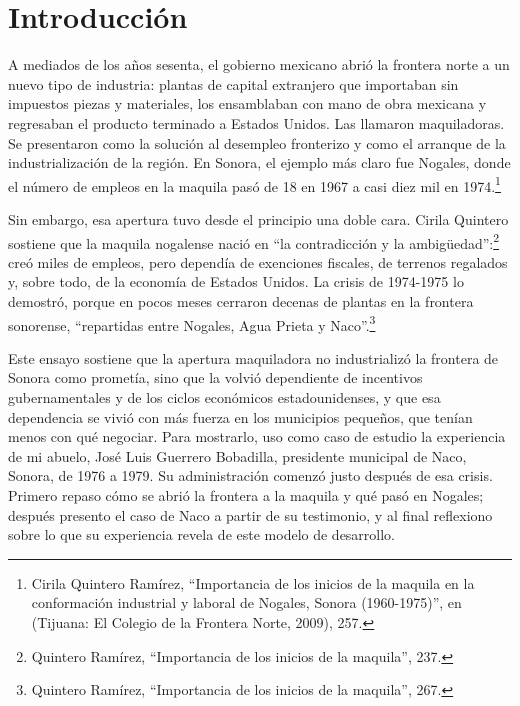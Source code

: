 \documentclass[12pt]{article}
\newcommand{\quinterolargo}{Cirila Quintero Ramírez, \enquote{Importancia de los inicios de la maquila en la conformación industrial y laboral de Nogales, Sonora (1960-1975)}, en \pendiente{\emph{Título del libro}, coord. Nombre} (Tijuana: El Colegio de la Frontera Norte, 2009)}
\newcommand{\quintero}{Quintero Ramírez, \enquote{Importancia de los inicios de la maquila}}
\begin{document}
\unisonportada
\thispagestyle{fancy}

\section{Introducción}

A mediados de los años sesenta, el gobierno mexicano abrió la frontera norte a un nuevo tipo de industria: plantas de capital extranjero que importaban sin impuestos piezas y materiales, los ensamblaban con mano de obra mexicana y regresaban el producto terminado a Estados Unidos. Las llamaron maquiladoras. Se presentaron como la solución al desempleo fronterizo y como el arranque de la industrialización de la región. En Sonora, el ejemplo más claro fue Nogales, donde el número de empleos en la maquila pasó de 18 en 1967 a casi diez mil en 1974.\footnote{\quinterolargo, 257.}

Sin embargo, esa apertura tuvo desde el principio una doble cara. Cirila Quintero sostiene que la maquila nogalense nació en \enquote{la contradicción y la ambigüedad}:\footnote{\quintero, 237.} creó miles de empleos, pero dependía de exenciones fiscales, de terrenos regalados y, sobre todo, de la economía de Estados Unidos. La crisis de 1974-1975 lo demostró, porque en pocos meses cerraron decenas de plantas en la frontera sonorense, \enquote{repartidas entre Nogales, Agua Prieta y Naco}.\footnote{\quintero, 267.}

Este ensayo sostiene que la apertura maquiladora no industrializó la frontera de Sonora como prometía, sino que la volvió dependiente de incentivos gubernamentales y de los ciclos económicos estadounidenses, y que esa dependencia se vivió con más fuerza en los municipios pequeños, que tenían menos con qué negociar. Para mostrarlo, uso como caso de estudio la experiencia de mi abuelo, José Luis Guerrero Bobadilla, presidente municipal de Naco, Sonora, de 1976 a 1979. Su administración comenzó justo después de esa crisis. Primero repaso cómo se abrió la frontera a la maquila y qué pasó en Nogales; después presento el caso de Naco a partir de su testimonio, y al final reflexiono sobre lo que su experiencia revela de este modelo de desarrollo.
\end{document}
